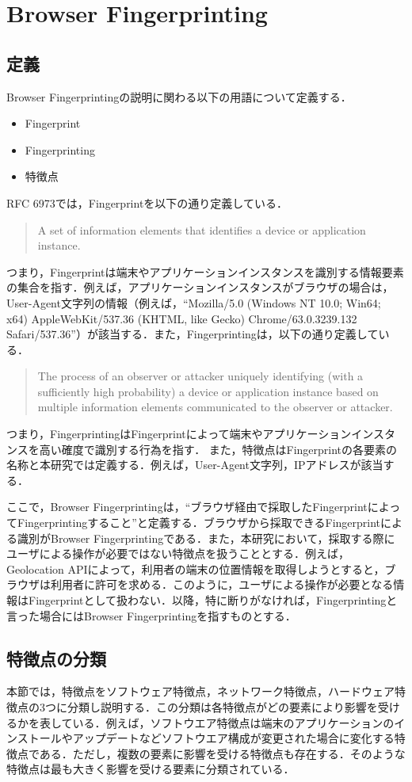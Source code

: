 \newpage
\section{Browser Fingerprinting}
\subsection{定義}
Browser Fingerprintingの説明に関わる以下の用語について定義する．
\begin{itemize}
 \item Fingerprint
 \item Fingerprinting
 \item 特徴点
\end{itemize}
RFC 6973\cite{rfc6973}では，Fingerprintを以下の通り定義している．
\begin{quote}
A set of information elements that identifies a device or application instance.
\end{quote}
つまり，Fingerprintは端末やアプリケーションインスタンスを識別する情報要素の集合を指す．例えば，アプリケーションインスタンスがブラウザの場合は，User-Agent文字列の情報（例えば，``Mozilla/5.0 (Windows NT 10.0; Win64; x64) AppleWebKit/537.36 (KHTML, like Gecko) Chrome/63.0.3239.132 Safari/537.36''）が該当する．また，Fingerprintingは，以下の通り定義している．
\begin{quote}
The process of an observer or attacker uniquely identifying (with a sufficiently high probability) a device or application instance based on multiple information elements communicated to the observer or attacker.
\end{quote}
つまり，FingerprintingはFingerprintによって端末やアプリケーションインスタンスを高い確度で識別する行為を指す．
また，特徴点はFingerprintの各要素の名称と本研究では定義する．例えば，User-Agent文字列，IPアドレスが該当する．

ここで，Browser Fingerprintingは，``ブラウザ経由で採取したFingerprintによってFingerprintingすること''と定義する．ブラウザから採取できるFingerprintによる識別がBrowser Fingerprintingである．また，本研究において，採取する際にユーザによる操作が必要ではない特徴点を扱うこととする．例えば，Geolocation APIによって，利用者の端末の位置情報を取得しようとすると，ブラウザは利用者に許可を求める．このように，ユーザによる操作が必要となる情報はFingerprintとして扱わない．以降，特に断りがなければ，Fingerprintingと言った場合にはBrowser Fingerprintingを指すものとする．

\subsection{特徴点の分類}
本節では，特徴点をソフトウェア特徴点，ネットワーク特徴点，ハードウェア特徴点の3つに分類し説明する．この分類は各特徴点がどの要素により影響を受けるかを表している．例えば，ソフトウエア特徴点は端末のアプリケーションのインストールやアップデートなどソフトウエア構成が変更された場合に変化する特徴点である．ただし，複数の要素に影響を受ける特徴点も存在する．そのような特徴点は最も大きく影響を受ける要素に分類されている．
